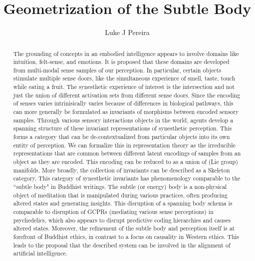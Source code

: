 \documentclass{article}
\title{\vspace{-3cm} Geometrization of the Subtle Body}
\author{Luke J Pereira}
\date{}
\theoremstyle{definition}
\begin{document}
\maketitle
\begin{abstract}
\noindent
The grounding of concepts in an embodied intelligence appears to involve domains like intuition, felt-sense, and emotions. It is proposed that these domains are developed from multi-modal sense samples of our perception.
In particular, certain objects stimulate multiple sense doors, like the simultaneous experience of smell, taste, touch while eating a fruit. The synesthetic experience of interest is the intersection and not just the union of different activation sets from different sense doors. Since the encoding of senses varies intrinisically varies because of differences in biological pathways, this can more generally be formulated as invariants of morphisms between encoded sensory samples.
Through various sensory interactions objects in the world, agents develop a spanning structure of these invariant representations of synesthetic perception. This forms a category that can be de-contextualized from particular objects into its own entity of perception.
We can formalize this in representation theory as the irreducible representations that are common between different latent encodings of samples from an object as they are encoded. This encoding can be reduced to as a union of (Lie group) manifolds. More broadly, the collection of invariants can be described as a Skeleton category.
This category of synesthetic invariants has phenomenology comparable to the ``subtle body" in Buddhist writings. The subtle (or energy) body is a non-physical object of meditation that is manipulated during various practices, often producing altered states and generating insights.
This disruption of a spanning body schema is comparable to disruption of GCPRs (mediating various sense perceptions) in psychedelics, which also appears to disrupt predictive coding hierarchies and causes altered states.
Moreover, the refinement of the subtle body and perception itself is at forefront of Buddhist ethics, in contrast to a focus on causality in Western ethics. This leads to the proposal that the described system can be involved in the alignment of artificial intelligence.
\end{abstract}

\newpage
\end{document}
